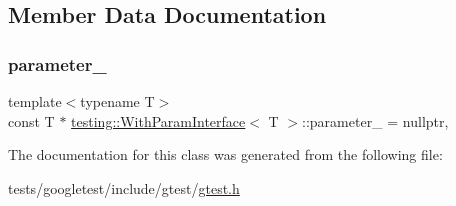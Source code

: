 \subsection{Member Data Documentation}
\mbox{\label{classtesting_1_1WithParamInterface_ad809d968c4285b535c5c74718d40ccf0}} 
\subsubsection{\texorpdfstring{parameter\+\_\+}{parameter\_}}
{\footnotesize\ttfamily template$<$typename T$>$ \\
const T $\ast$ \hyperlink{classtesting_1_1WithParamInterface}{testing\+::\+With\+Param\+Interface}$<$ T $>$\+::parameter\+\_\+ = nullptr\hspace{0.3cm}{\ttfamily [static]}, {\ttfamily [private]}}



The documentation for this class was generated from the following file\+:\begin{DoxyCompactItemize}
\item 
tests/googletest/include/gtest/\hyperlink{gtest_8h}{gtest.\+h}\end{DoxyCompactItemize}

